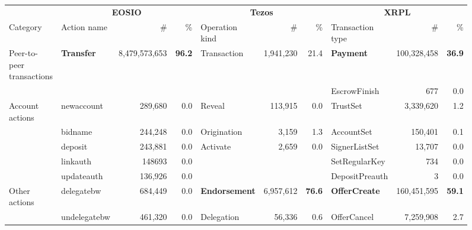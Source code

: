 \begin{figure*}[htbp]
  \centering
    \setlength{\tabcolsep}{1.4pt}
    \footnotesize
    \begin{tabular}{@{}lp{0.7in}rrp{1.2in}rrp{0.9in}rr@{}}
        \toprule
      & \multicolumn{3}{c}{\textbf{EOSIO}} & \multicolumn{3}{c}{\textbf{Tezos}} & \multicolumn{3}{c}{\textbf{ XRPL }} \\
    Category & Action name & \# & \% & Operation kind & \# & \% & Transaction type &  \#  & \% \\
    \cmidrule(r){1-1} \cmidrule(rl){2-4} \cmidrule(rl){5-7} \cmidrule(l){8-10}
    Peer-to-peer transactions & \textbf{Transfer} &    8,479,573,653  & \textbf{             96.2 } & Transaction &    1,941,230  &      21.4  & \textbf{Payment} &    100,328,458  & \textbf{     36.9} \\
      &   &   &   &   &   &   & EscrowFinish &                    677  &         0.0  \\
    \cmidrule(r){1-1} \cmidrule(rl){2-4} \cmidrule(rl){5-7} \cmidrule(l){8-10}
    Account actions & newaccount &                289,680  &                0.0  & Reveal &        113,915  &         0.0  & TrustSet &         3,339,620  &         1.2  \\
      & bidname &                244,248  &                0.0  & Origination &            3,159  &         1.3  & AccountSet &            150,401  &         0.1  \\
      & deposit &                243,881  &                0.0  & Activate &            2,659  &         0.0  & SignerListSet &              13,707  &         0.0  \\
      & linkauth & 148693 & 0.0 &   &   &   & SetRegularKey &                    734  &         0.0  \\
      & updateauth &                136,926  &                0.0  &   &   &   & DepositPreauth &                         3  &         0.0  \\
    \cmidrule(r){1-1} \cmidrule(rl){2-4} \cmidrule(rl){5-7} \cmidrule(l){8-10}
    Other actions & delegatebw &                684,449  &                0.0  & \textbf{Endorsement} &    6,957,612  & \textbf{     76.6} & \textbf{OfferCreate} &    160,451,595  & \textbf{     59.1} \\
      & undelegatebw &                461,320  &                0.0  & Delegation &          56,336  &         0.6  & OfferCancel &         7,259,908  &         2.7  \\

\end{tabular}
\end{figure*}
